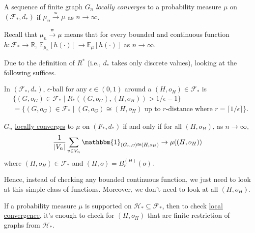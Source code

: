 \begin{definition}\label{def:local-convergence}
	A sequence of finite graph \(G_n\) \emph{locally converges} to a probability measure \(\mu \) on \((\mathcal{F} _{\ast} , d_{\ast} )\) if \(\mu _n \overset{\text{w} }{\to} \mu \) as \(n \to \infty \).
\end{definition}

\begin{note}
	Recall that \(\mu _n \overset{\text{w} }{\to} \mu \) means that for every bounded and continuous function \(h \colon \mathcal{F} _{\ast} \to \mathbb{R} \), \(\mathbb{E}_{\mu _n}[h(\cdot)] \to \mathbb{E}_{\mu }[h(\cdot)] \) as \(n \to \infty \).
\end{note}

Due to the definition of \(R^{\ast} \) (i.e., \(d_{\ast} \) takes only discrete values), looking at the following suffices.

\begin{claim}
	In \((\mathcal{F} _{\ast} , d_{\ast} )\), \(\epsilon \)-ball for any \(\epsilon \in (0, 1)\) around a \((H, o_H) \in \mathcal{F} _{\ast} \) is
	\[
		\begin{split}
			 & \{ (G, o_G) \in \mathcal{F} _{\ast} \mid R_{\ast} ((G, o_G), (H, o_H)) > 1 / \epsilon - 1 \}                                              \\
			 & = \{ (G, o_G) \in \mathcal{F} _{\ast} \mid (G, o_G) \cong (H, o_H)\text{ up to \(r\)-distance where } r = \lceil 1 / \epsilon  \rceil \}.
		\end{split}
	\]
\end{claim}

\begin{theorem}
	\(G_n\) \hyperref[def:local-convergence]{locally converges} to \(\mu \) on \((F_{\ast} , d_{\ast} )\) if and only if for all \((H, o_H)\), as \(n \to \infty \),
	\[
		\frac{1}{\lvert V_n \rvert } \sum_{v \in V_n} \mathbbm{1}_{(G_n, v) \cong (H, o_H)}
		\to \mu ((H, o_H))
	\]
	where \((H, o_H) \in \mathcal{F} _{\ast} \) and \((H, o) = B_r^{(H)}(o)\).
\end{theorem}

Hence, instead of checking any bounded continuous function, we just need to look at this simple class of functions. Moreover, we don't need to look at all \((H, o_H)\).

\begin{lemma}
	If a probability measure \(\mu \) is supported on \(\mathcal{H} _{\ast} \subseteq \mathcal{F} _{\ast} \), then to check \hyperref[def:local-convergence]{local convergence}, it's enough to check for \((H, o_H)\) that are finite restriction of graphs from \(\mathcal{H} _{\ast} \).
\end{lemma}

